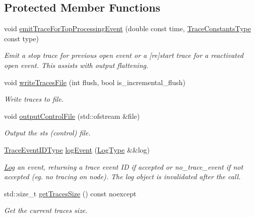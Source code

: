\subsection*{Protected Member Functions}
\begin{DoxyCompactItemize}
\item 
void \hyperlink{structvt_1_1trace_1_1_trace_lite_a6d33deb4bef608ff3c68dcf80b2fcc42}{emit\+Trace\+For\+Top\+Processing\+Event} (double const time, \hyperlink{namespacevt_1_1trace_acf454dfbd581b0ebae895f90b5927a1d}{Trace\+Constants\+Type} const type)
\begin{DoxyCompactList}\small\item\em Emit a \textquotesingle{}stop\textquotesingle{} trace for previous open event or a \textquotesingle{}\mbox{[}re\mbox{]}start\textquotesingle{} trace for a reactivated open event. This assists with output flattening. \end{DoxyCompactList}\item 
void \hyperlink{structvt_1_1trace_1_1_trace_lite_aa385172051bc8f3fc58a345fec10eae2}{write\+Traces\+File} (int flush, bool is\+\_\+incremental\+\_\+flush)
\begin{DoxyCompactList}\small\item\em Write traces to file. \end{DoxyCompactList}\item 
void \hyperlink{structvt_1_1trace_1_1_trace_lite_a7b60eedbf68a4989a1566f2cf85d94dd}{output\+Control\+File} (std\+::ofstream \&file)
\begin{DoxyCompactList}\small\item\em Output the sts (control) file. \end{DoxyCompactList}\item 
\hyperlink{namespacevt_1_1trace_a64a7185f3e102df8d8258f263ccd1582}{Trace\+Event\+I\+D\+Type} \hyperlink{structvt_1_1trace_1_1_trace_lite_aeb468f1222761674e4ffb0cfa27f0641}{log\+Event} (\hyperlink{structvt_1_1trace_1_1_trace_lite_aeb73e523d31829d3163c877b145afa2a}{Log\+Type} \&\&log)
\begin{DoxyCompactList}\small\item\em \hyperlink{structvt_1_1trace_1_1_log}{Log} an event, returning a trace event ID if accepted or {\ttfamily no\+\_\+trace\+\_\+event} if not accepted (eg. no tracing on node). The log object is invalidated after the call. \end{DoxyCompactList}\item 
std\+::size\+\_\+t \hyperlink{structvt_1_1trace_1_1_trace_lite_a41527439099e35c51d539201238dbe96}{get\+Traces\+Size} () const noexcept
\begin{DoxyCompactList}\small\item\em Get the current traces size. \end{DoxyCompactList}\end{DoxyCompactItemize}
